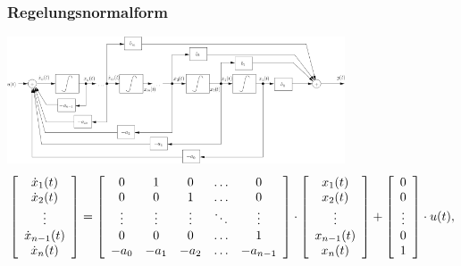 \subsubsection{Regelungsnormalform }
\includegraphics[width=10cm]{./bilder/zrd-regelungsnormalform.png} \\
\scriptsize
\begin{equation*}
\left [ 
\begin{array}{c}
\dot{x}_1(t)\\
\dot{x}_2(t)\\
\vdots\\
\dot{x}_{n-1}(t)\\
\dot{x}_{n}(t)\\
\end{array}
\right ] =
\left [ 
\begin{array}{c c c c c}
0 & 1 & 0 & \ldots & 0\\
0 & 0 & 1 & \ldots & 0\\
\vdots & \vdots & \vdots & \ddots & \vdots\\
0 & 0 & 0 & \ldots & 1\\
-a_0 & -a_1 & -a_2 & \ldots & -a_{n-1}\\
\end{array}
\right ]\cdot
\left [ 
\begin{array}{c}
x_1(t)\\
x_2(t)\\
\vdots \\
x_{n-1}(t)\\
x_{n}(t)\\
\end{array}
\right ]+
\left [ 
\begin{array}{c}
0 \\
0\\
\vdots\\
0\\
1\\
\end{array}
\right ]\cdot
u(t),
\end{equation*}
